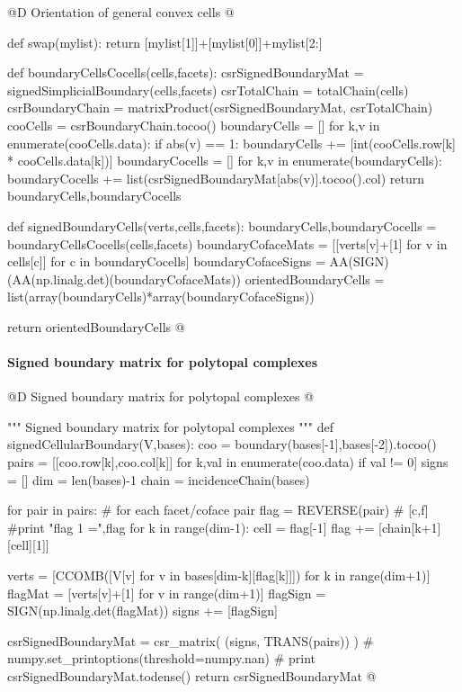 \documentclass[11pt,oneside]{article}	%
\begin{document}
@D Orientation of general convex cells
@{def swap(mylist): return [mylist[1]]+[mylist[0]]+mylist[2:]

def boundaryCellsCocells(cells,facets):
	csrSignedBoundaryMat = signedSimplicialBoundary(cells,facets)
	csrTotalChain = totalChain(cells)
	csrBoundaryChain = matrixProduct(csrSignedBoundaryMat, csrTotalChain)
	cooCells = csrBoundaryChain.tocoo()	
	boundaryCells = []
	for k,v in enumerate(cooCells.data):
		if abs(v) == 1:
			boundaryCells += [int(cooCells.row[k] * cooCells.data[k])]			
	boundaryCocells = []
	for k,v in enumerate(boundaryCells):
		boundaryCocells += list(csrSignedBoundaryMat[abs(v)].tocoo().col)		
	return boundaryCells,boundaryCocells

def signedBoundaryCells(verts,cells,facets):
	boundaryCells,boundaryCocells = boundaryCellsCocells(cells,facets)		
	boundaryCofaceMats = [[verts[v]+[1] for v in cells[c]] for c in boundaryCocells]
	boundaryCofaceSigns = AA(SIGN)(AA(np.linalg.det)(boundaryCofaceMats))
	orientedBoundaryCells = list(array(boundaryCells)*array(boundaryCofaceSigns))
	
	return orientedBoundaryCells
@}

\paragraph{Signed boundary matrix for polytopal complexes}

@D Signed boundary matrix for polytopal complexes
@{""" Signed boundary matrix for polytopal complexes """
def signedCellularBoundary(V,bases):
	coo = boundary(bases[-1],bases[-2]).tocoo()
	pairs = [[coo.row[k],coo.col[k]] for k,val in enumerate(coo.data) if val != 0]
	signs = []
	dim = len(bases)-1
	chain = incidenceChain(bases)
	
	for pair in pairs:		# for each facet/coface pair
		flag = REVERSE(pair) #  [c,f]
		#print "flag 1 =",flag
		for k in range(dim-1):
			cell = flag[-1]
			flag += [chain[k+1][cell][1]]
		
		verts = [CCOMB([V[v] for v in bases[dim-k][flag[k]]]) for k in range(dim+1)]
		flagMat = [verts[v]+[1] for v in range(dim+1)]
		flagSign = SIGN(np.linalg.det(flagMat))
		signs += [flagSign]
	
	csrSignedBoundaryMat = csr_matrix( (signs, TRANS(pairs)) )
	# numpy.set_printoptions(threshold=numpy.nan)
	# print csrSignedBoundaryMat.todense()
	return csrSignedBoundaryMat
@}
\end{document}
